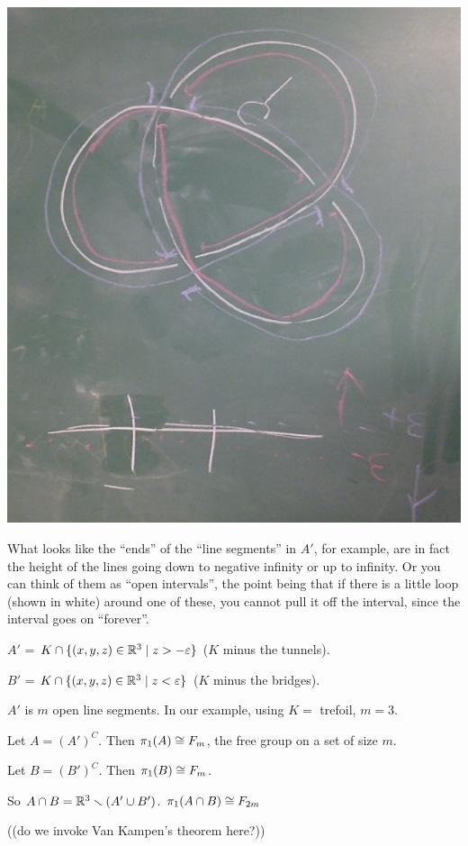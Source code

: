 \documentclass[11pt,leqno,oneside]{amsart}
\numberwithin{thm}{section}
\newcommand{\minus}{\smallsetminus}
\renewcommand{\epsilon}{\varepsilon}
\newcommand{\fund}[1][1]{\pi_{#1}}
\begin{document}
\begin{example}
  \includegraphics[scale=0.2]{images/trefoil-with-red-and-blue.jpg}

  What looks like the ``ends'' of the ``line segments'' in $A'$, for example, are in fact the height of the lines going down to negative infinity or up to infinity.  Or you can think of them as ``open intervals'', the point being that if there is a little loop (shown in white) around one of these, you cannot pull it off the interval, since the interval goes on ``forever''.

  $A'$ = $K \cap \{(x,y,z) \in \R^3 \mid z > -\epsilon\}$ ($K$ minus the tunnels).

  $B'$ = $K \cap \{(x,y,z) \in \R^3 \mid z < \epsilon\}$ ($K$ minus the bridges).

  $A'$ is $m$ open line segments.  In our example, using $K =$ trefoil, $m = 3$.

  Let $A = (A')^C$.  Then $\fund(A) \isom F_m$, the free group on a set of size $m$.

  Let $B = (B')^C$.  Then $\fund(B) \isom F_m$.

  So $A \cap B = \R^3 \minus (A' \union B')$.  $\fund(A \cap B) \isom F_{2m}$

  ((do we invoke Van Kampen's theorem here?))


\end{example}
\end{document}
